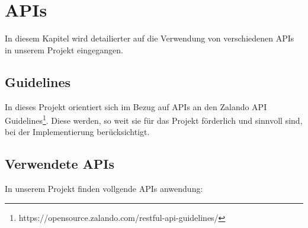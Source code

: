 \chapter{\ac{API}s}\label{ch:apis}
In diesem Kapitel wird detailierter auf die Verwendung von verschiedenen \ac{API}s in unserem Projekt
eingegangen.

\section{Guidelines}
In dieses Projekt orientiert sich im Bezug auf \ac{API}s an den Zalando API Guidelines\footnote{https://opensource.zalando.com/restful-api-guidelines/}. 
Diese werden, so weit sie für das Projekt förderlich und sinnvoll sind, bei der Implementierung 
berücksichtigt.
\section{Verwendete \ac{API}s}
In unserem Projekt finden vollgende \ac{API}s anwendung:
